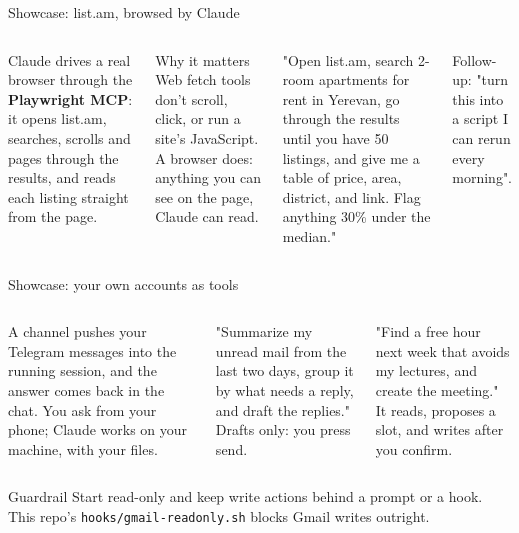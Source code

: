 \documentclass[aspectratio=169,11pt,t]{beamer}
\begin{document}
\begin{frame}{Showcase: list.am, browsed by Claude}
  \begin{columns}[T,onlytextwidth]
      \small Claude drives a real browser through the \textbf{Playwright MCP}: it opens list.am, searches, scrolls and pages through the results, and reads each listing straight from the page.\par\vspace{0.5em}
      \begin{callout}[good]{Why it matters}
        Web fetch tools don't scroll, click, or run a site's JavaScript. A browser does: anything you can see on the page, Claude can read.
      \end{callout}
      \par\vspace{0.25em}
      {\footnotesize "Open list.am, search 2-room apartments for rent in Yerevan, go through the results until you have 50 listings, and give me a table of price, area, district, and link. Flag anything 30\% under the median."}\par\vspace{0.5em}
      {\footnotesize\color{muted}Follow-up: "turn this into a script I can rerun every morning".}
  \end{columns}
\end{frame}

\begin{frame}{Showcase: your own accounts as tools}
  \begin{columns}[T,onlytextwidth]
      \par\vspace{0.25em}\footnotesize
      A channel pushes your Telegram messages into the running session, and the answer comes back in the chat. You ask from your phone; Claude works on your machine, with your files.
      \par\vspace{0.25em}\footnotesize
      "Summarize my unread mail from the last two days, group it by what needs a reply, and draft the replies." Drafts only: you press send.
      \par\vspace{0.25em}\footnotesize
      "Find a free hour next week that avoids my lectures, and create the meeting." It reads, proposes a slot, and writes after you confirm.
  \end{columns}\par\vspace{0.7em}
  \begin{callout}[warn]{Guardrail}
    Start read-only and keep write actions behind a prompt or a hook. This repo's \texttt{hooks/gmail-readonly.sh} blocks Gmail writes outright.
  \end{callout}
\end{frame}
\end{document}
